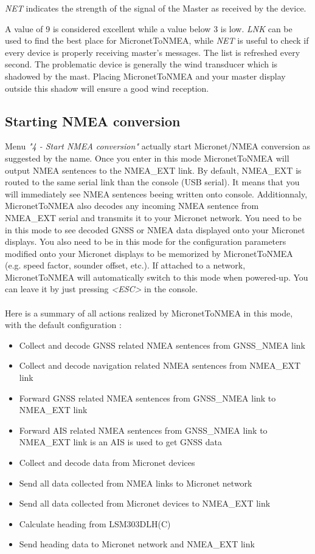 \documentclass{report}
\begin{document}
\emph{NET} indicates the strength of the signal of the Master as received by the device.

A value of 9 is considered excellent while a value below 3 is low. \emph{LNK} can be used to find the best place for MicronetToNMEA, while \emph{NET} is useful to check if every device is properly receiving master's messages. The list is refreshed every second. The problematic device is generally the wind transducer which is shadowed by the mast. Placing MicronetToNMEA and your master display outside this shadow will ensure a good wind reception.

\subsection{Starting NMEA conversion}

Menu \emph{"4 - Start NMEA conversion"} actually start Micronet/NMEA conversion as suggested by the name. Once you enter in this mode MicronetToNMEA will output NMEA sentences to the NMEA\_EXT link. By default, NMEA\_EXT is routed to the same serial link than the console (USB serial). It means that you will immediately see NMEA sentences beeing written onto console. Additionnaly, MicronetToNMEA also decodes any incoming NMEA sentence from NMEA\_EXT serial and transmits it to your Micronet network.
You need to be in this mode to see decoded GNSS or NMEA data displayed onto your Micronet displays. You also need to be in this mode for the configuration parameters modified onto your Micronet displays to be memorized by MicronetToNMEA (e.g. speed factor, sounder offset, etc.).
If attached to a network, MicronetToNMEA will automatically switch to this mode when powered-up. You can leave it by just pressing \emph{<ESC>} in the console.
\\
\\
Here is a summary of all actions realized by MicronetToNMEA in this mode, with the default configuration :
\begin{itemize}
	\item Collect and decode GNSS related NMEA sentences from GNSS\_NMEA link
	\item Collect and decode navigation related NMEA sentences from NMEA\_EXT link
	\item Forward GNSS related NMEA sentences from GNSS\_NMEA link to NMEA\_EXT link
	\item Forward AIS related NMEA sentences from GNSS\_NMEA link to NMEA\_EXT link is an AIS is used to get GNSS data
	\item Collect and decode data from Micronet devices
	\item Send all data collected from NMEA links to Micronet network
	\item Send all data collected from Micronet devices to NMEA\_EXT link
	\item Calculate heading from LSM303DLH(C)
	\item Send heading data to Micronet network and NMEA\_EXT link
\end{itemize}
\end{document}
